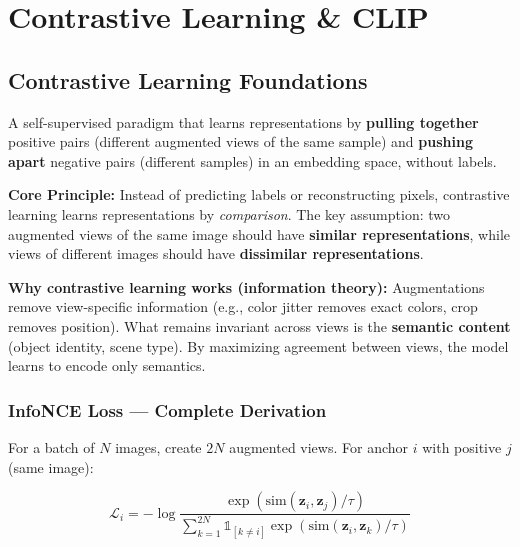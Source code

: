 \section{Contrastive Learning \& CLIP}

\subsection{Contrastive Learning Foundations}

\begin{definition}
A self-supervised paradigm that learns representations by \textbf{pulling together} positive pairs (different augmented views of the same sample) and \textbf{pushing apart} negative pairs (different samples) in an embedding space, without labels.
\end{definition}

\textbf{Core Principle:} Instead of predicting labels or reconstructing pixels, contrastive learning learns representations by \emph{comparison}. The key assumption: two augmented views of the same image should have \textbf{similar representations}, while views of different images should have \textbf{dissimilar representations}.

\textbf{Why contrastive learning works (information theory):} Augmentations remove view-specific information (e.g., color jitter removes exact colors, crop removes position). What remains invariant across views is the \textbf{semantic content} (object identity, scene type). By maximizing agreement between views, the model learns to encode only semantics.

\subsubsection{InfoNCE Loss — Complete Derivation}
For a batch of $N$ images, create $2N$ augmented views. For anchor $i$ with positive $j$ (same image):

\begin{equation}\label{eq:infonce}
\boxed{\mathcal{L}_i = -\log \frac{\exp(\text{sim}(\mathbf{z}_i, \mathbf{z}_j)/\tau)}{\sum_{k=1}^{2N} \mathbb{1}_{[k \neq i]} \exp(\text{sim}(\mathbf{z}_i, \mathbf{z}_k)/\tau)}}
\end{equation}

